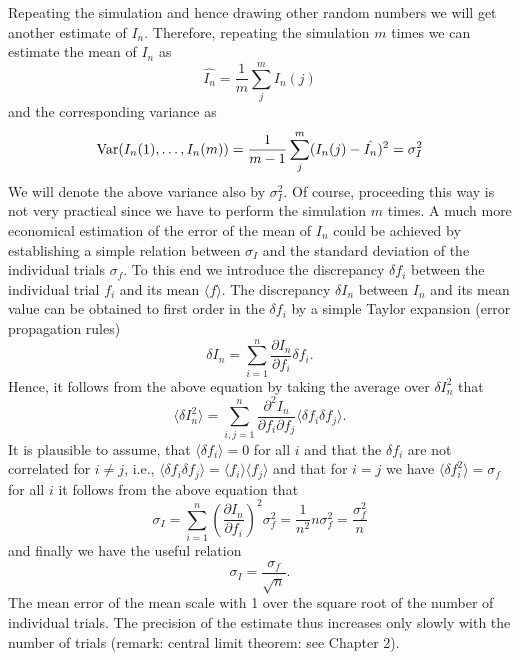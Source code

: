 Repeating the 
simulation and hence drawing other random numbers we will get another
estimate of $I_n$. Therefore, repeating the simulation $m$ times 
we can estimate the mean of $I_n$ as
\begin{equation}
\hat{I_n} = \frac{1}{m} \sum_j^m I_n(j)
\end{equation}
and the corresponding variance as
\begin{equation}
{\rm Var}(I_n(1), \ldots, I_n(m)) = 
\frac{1}{m-1} \sum_j^m (I_n(j) - \hat{I_n})^2 = \sigma_I^2
\end{equation}
We will denote the above variance also by $\sigma_I^2$.
Of course, proceeding this way is not very practical since we
have to perform the simulation $m$ times. A much more economical
estimation of the error of the mean of $I_n$ could be achieved by 
establishing a simple relation between $\sigma_I$ and the standard 
deviation of the individual trials $\sigma_f$. To this end we 
introduce the discrepancy $\delta f_i$ between the
individual trial $f_i$ and its mean $\langle f \rangle$. The 
discrepancy $\delta I_n$ between $I_n$ and its mean value can be
obtained to first order in the $\delta f_i$ by a simple Taylor 
expansion (error propagation rules)
\begin{equation}
\delta I_n = \sum_{i=1}^n \frac{\partial I_n}{\partial f_i} \delta 
f_i.
\end{equation}
Hence, it follows from the above equation by taking the average over
$\delta I_n^2$ that
\begin{equation}
\langle \delta I_n^2 \rangle = \sum_{i,j=1}^{n}
    \frac{\partial^2 I_n}{\partial f_i \partial f_j} 
     \langle \delta f_i \delta f_j \rangle.
\end{equation}
It is plausible to assume, that 
$\langle \delta f_i \rangle = 0$
for all $i$ and that the $\delta f_i$ are not correlated
for $i \neq j$, i.e.,
$\langle \delta f_i \delta f_j \rangle = \langle f_i \rangle \langle f_j \rangle$
and that for $i=j$ we have $\langle \delta f_i^2 \rangle = \sigma_f$ 
for all $i$ it follows from the above equation that
\begin{equation}
\sigma_I = \sum_{i=1}^n \left(
      \frac{\partial I_n}{\partial f_i} \right)^2 \sigma_f^2
      = \frac{1}{n^2} n \sigma_f^2 = \frac{\sigma_f^2}{n}
\end{equation}
and finally we have the useful relation
\begin{equation}
\sigma_I = \frac{\sigma_f}{\sqrt{n}}.
\end{equation}
The mean error of the mean scale with 1 over the square root of 
the number of individual trials. The precision of the estimate 
thus increases only slowly with the number of trials (remark: central
limit theorem: see Chapter 2).

